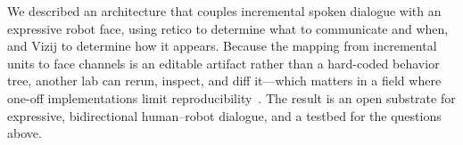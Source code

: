 \documentclass[conference]{IEEEtran}
\begin{document}
%
We described an architecture that couples incremental spoken dialogue with an
expressive robot face, using retico to determine what to communicate and when,
and Vizij to determine how it appears. Because the mapping from incremental
units to face channels is an editable artifact rather than a hard-coded
behavior tree, another lab can rerun, inspect, and diff it---which matters in
a field where one-off implementations limit
reproducibility~\cite{gunes2022reproducibility}. The result is an open
substrate for expressive, bidirectional human--robot dialogue, and a testbed
for the questions above.




%
%
%
\nocite{andrist2014aversion,kipp2015gazeattention,pejsa2013stylizedgaze,
        ribeiro2019nutty,ribeiro2017erik,schoen2023lively,
        ribeiro2012illusion,gielniak2011readability,hoffman2014movement,
        lasseter1987principles,zhou2018visemenet,karras2017audiodriven,
        cudeiro2019voca,fan2022faceformer,
        bartneck2009godspeed,generativenonverbal2026,hu2026liplearning}



\end{document}
